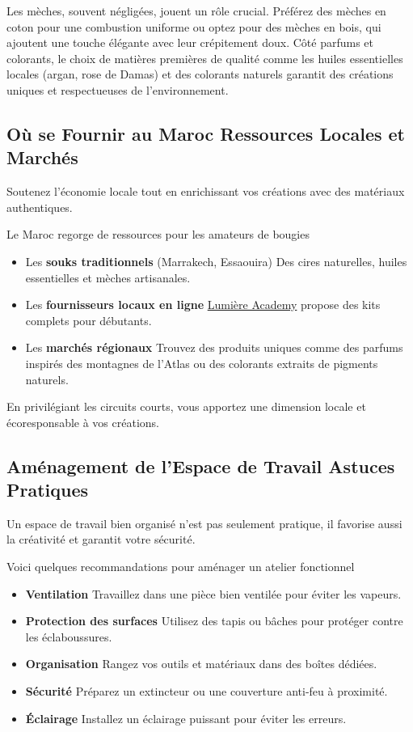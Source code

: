 \documentclass[11pt,fleqn,onecolumn,oneside]{book}
\begin{document}
Les mèches, souvent négligées, jouent un rôle crucial. Préférez des mèches en coton pour une combustion uniforme ou optez pour des mèches en bois, qui ajoutent une touche élégante avec leur crépitement doux. Côté parfums et colorants, le choix de matières premières de qualité comme les huiles essentielles locales (argan, rose de Damas) et des colorants naturels garantit des créations uniques et respectueuses de l’environnement.

\subsection*{Où se Fournir au Maroc Ressources Locales et Marchés}

\begin{exercise}
Soutenez l’économie locale tout en enrichissant vos créations avec des matériaux authentiques.
\end{exercise}

Le Maroc regorge de ressources pour les amateurs de bougies
\begin{itemize}
    \item Les \textbf{souks traditionnels} (Marrakech, Essaouira) Des cires naturelles, huiles essentielles et mèches artisanales.
    \item Les \textbf{fournisseurs locaux en ligne} \href{https://www.lumiereacademy.com}{Lumière Academy} propose des kits complets pour débutants.
    \item Les \textbf{marchés régionaux} Trouvez des produits uniques comme des parfums inspirés des montagnes de l’Atlas ou des colorants extraits de pigments naturels.
\end{itemize}

En privilégiant les circuits courts, vous apportez une dimension locale et écoresponsable à vos créations.

\subsection*{Aménagement de l’Espace de Travail Astuces Pratiques}

\begin{corollary}
Un espace de travail bien organisé n’est pas seulement pratique, il favorise aussi la créativité et garantit votre sécurité.
\end{corollary}

Voici quelques recommandations pour aménager un atelier fonctionnel
\begin{itemize}
    \item \textbf{Ventilation} Travaillez dans une pièce bien ventilée pour éviter les vapeurs.
    \item \textbf{Protection des surfaces} Utilisez des tapis ou bâches pour protéger contre les éclaboussures.
    \item \textbf{Organisation} Rangez vos outils et matériaux dans des boîtes dédiées.
    \item \textbf{Sécurité} Préparez un extincteur ou une couverture anti-feu à proximité.
    \item \textbf{Éclairage} Installez un éclairage puissant pour éviter les erreurs.
\end{itemize}
\end{document}
